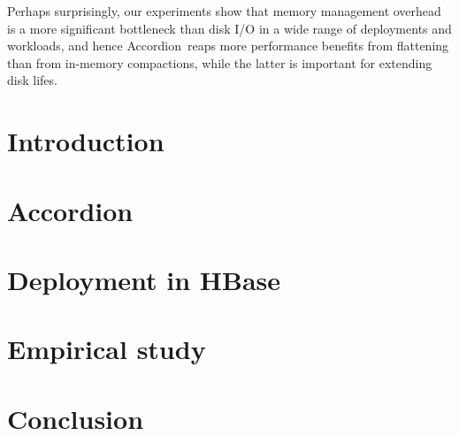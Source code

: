 \documentclass[letterpaper,twocolumn,10pt]{article}
\newcommand{\sys}{Accordion}
\begin{document}
Perhaps surprisingly, our experiments show that memory management overhead is a more significant bottleneck than disk I/O in a
wide range of deployments and workloads, and hence \sys\ reaps more performance benefits from flattening than from in-memory compactions,
while the latter is important for extending disk lifes.


\section{Introduction} \label{sec:intro}
 

\section{\sys} \label{sec:accordion}
 

\section{Deployment in HBase} \label{sec:hbase}

\section{Empirical study} \label{sec:eval}

\section{Conclusion} \label{sec:conclusions}



\newpage




\end{document}
